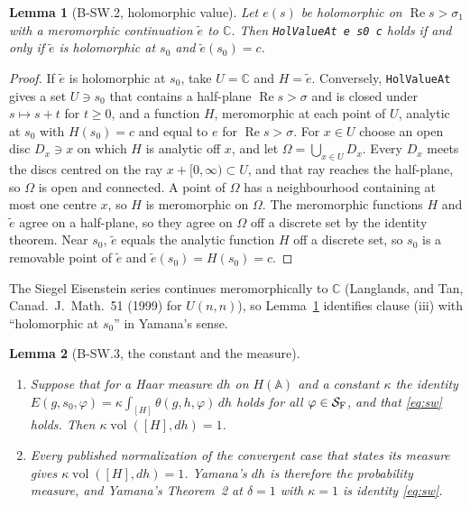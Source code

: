 \documentclass[11pt]{article}
\newcommand{\lean}[1]{\nolinkurl{#1}}
\newtheorem{lemma}{Lemma}
\theoremstyle{definition}
\begin{document}
\begin{lemma}[B-SW.2, holomorphic value]\label{lem:hol}
Let $e(s)$ be holomorphic on $\operatorname{Re}s>\sigma_1$ with a meromorphic continuation $\tilde e$ to $\mathbb C$. Then \lean{HolValueAt e s0 c} holds if and only if $\tilde e$ is holomorphic at $s_0$ and $\tilde e(s_0)=c$.
\end{lemma}

\begin{proof}
If $\tilde e$ is holomorphic at $s_0$, take $U=\mathbb C$ and $H=\tilde e$. Conversely, \lean{HolValueAt} gives a set $U\ni s_0$ that contains a half-plane $\operatorname{Re}s>\sigma$ and is closed under $s\mapsto s+t$ for $t\ge0$, and a function $H$, meromorphic at each point of $U$, analytic at $s_0$ with $H(s_0)=c$ and equal to $e$ for $\operatorname{Re}s>\sigma$. For $x\in U$ choose an open disc $D_x\ni x$ on which $H$ is analytic off $x$, and let $\Omega=\bigcup_{x\in U}D_x$. Every $D_x$ meets the discs centred on the ray $x+[0,\infty)\subset U$, and that ray reaches the half-plane, so $\Omega$ is open and connected. A point of $\Omega$ has a neighbourhood containing at most one centre $x$, so $H$ is meromorphic on $\Omega$. The meromorphic functions $H$ and $\tilde e$ agree on a half-plane, so they agree on $\Omega$ off a discrete set by the identity theorem. Near $s_0$, $\tilde e$ equals the analytic function $H$ off a discrete set, so $s_0$ is a removable point of $\tilde e$ and $\tilde e(s_0)=H(s_0)=c$.
\end{proof}

The Siegel Eisenstein series continues meromorphically to $\mathbb C$ (Langlands, and Tan, Canad.\ J.\ Math.\ 51 (1999) for $U(n,n)$), so Lemma~\ref{lem:hol} identifies clause (iii) with ``holomorphic at $s_0$'' in Yamana's sense.

\begin{lemma}[B-SW.3, the constant and the measure]\label{lem:kappa}
\begin{enumerate}[label=(\alph*)]
\item Suppose that for a Haar measure $dh$ on $H(\mathbb A)$ and a constant $\kappa$ the identity $E(g,s_0,\varphi)=\kappa\int_{[H]}\theta(g,h,\varphi)\,dh$ holds for all $\varphi\in\mathcal S_{\rm F}$, and that \eqref{eq:sw} holds. Then $\kappa\operatorname{vol}([H],dh)=1$.
\item Every published normalization of the convergent case that states its measure gives $\kappa\operatorname{vol}([H],dh)=1$. Yamana's $dh$ is therefore the probability measure, and Yamana's Theorem~2 at $\delta=1$ with $\kappa=1$ is identity \eqref{eq:sw}.
\end{enumerate}
\end{lemma}
\end{document}
